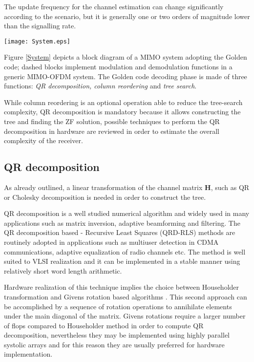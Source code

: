 \documentclass[12pt,onecolumn,draftclsnofoot]{IEEEtran}
\begin{document}
The update frequency for the channel estimation can change
significantly according to the scenario, but it is generally one or
two orders of magnitude lower than the signalling rate.
\begin{figure*}[t!]
    \begin{center}
    \texttt{[image: System.eps]} \caption{Golden Code MIMO System.}
    \label{System}
    \end{center}
\end{figure*}
Figure \ref{System} depicts a block diagram of a MIMO system adopting
the Golden code; dashed blocks implement modulation and
demodulation functions in a generic MIMO-OFDM system. The Golden
code decoding phase is made of three functions: {\em
QR decomposition, column reordering} and {\em tree search}.

While column reordering is an optional operation able to reduce the
tree-search complexity, QR decomposition is mandatory because it
allows constructing the tree and finding the ZF solution, possible
techniques to perform the QR decomposition in hardware are reviewed
in order to estimate the overall complexity of the receiver.


\subsection{QR decomposition}

As already outlined, a linear transformation of the channel matrix $\boldsymbol{H}$,
such as QR or Cholesky decomposition is needed in order to construct the tree.

QR decomposition is a well studied numerical algorithm and widely
used in many applications such as matrix inversion, adaptive
beamforming and filtering. The QR decomposition based - Recursive Least
Squares (QRD-RLS) methods are routinely adopted in applications such
as multiuser detection in CDMA communications, adaptive equalization
of radio channels etc. The method is well suited to VLSI realization
and it can be implemented in a stable manner using relatively short
word length arithmetic.

Hardware realization of this technique implies the choice between
Householder transformation and Givens rotation based algorithms
\cite{MxCom}. This second approach can be accomplished by a sequence
of rotation operations to annihilate elements under the main
diagonal of the matrix. Givens rotations require a larger number of
flops compared to Householder method in order to compute QR
decomposition, nevertheless they may be implemented using highly
parallel systolic arrays and for this reason they are usually
preferred for hardware implementation.
\end{document}
